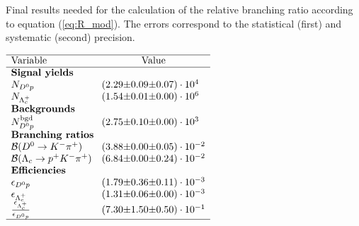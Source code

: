  
\begin{table}[tb]
    \centering
    \caption{Final results needed for the calculation of the relative branching ratio \R according to equation (\ref{eq:R_mod}). The errors correspond to the statistical (first) and systematic (second) precision.}
    \label{tab:table_finalresults}
    $\begin{array}{lr@{\pm}r@{\pm}l}
    \hline
    \text{Variable} & \multicolumn{3}{c}{\text{Value}} \\
    \hline
\multicolumn{4}{l}{\text{\textbf{Signal yields}}} \\
\NDp&(2.29 & 0.09 & 0.07) \cdot 10^{4}\\
\NLc&(1.54 & 0.01 & 0.00) \cdot 10^{6}\\
\multicolumn{4}{l}{\text{\textbf{Backgrounds}}} \\
\NBgdDp&(2.75 & 0.10 & 0.00) \cdot 10^{3}\\
\multicolumn{4}{l}{\text{\textbf{Branching ratios}}} \\
\DBFDp&(3.88 & 0.00 & 0.05) \cdot 10^{-2}\\
\DBFLc&(6.84 & 0.00 & 0.24) \cdot 10^{-2}\\
\multicolumn{4}{l}{\text{\textbf{Efficiencies}}} \\
\effDp&(1.79 & 0.36 & 0.11) \cdot 10^{-3}\\
\effLc&(1.31 & 0.06 & 0.00) \cdot 10^{-3}\\
\frac{\effLc}{\effDp}&(7.30 & 1.50 & 0.50) \cdot 10^{-1}\\

    \hline
    \end{array}$
\end{table}
